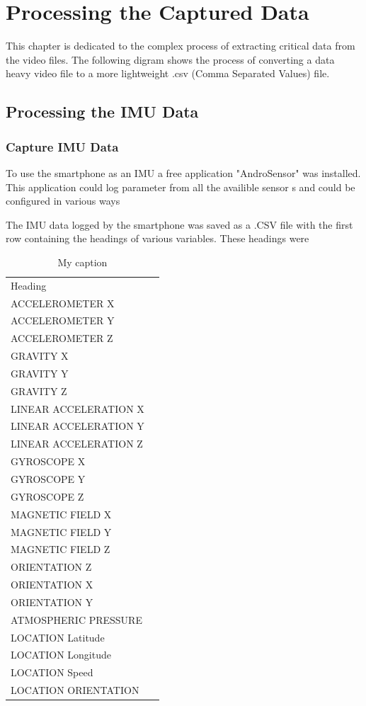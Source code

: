 \chapter{Processing the Captured Data}
This chapter is dedicated to the complex process of extracting critical data from the video files. The following digram shows the process of converting a data heavy video file to a more lightweight .csv (Comma Separated Values) file.

\section{Processing the IMU Data}

\subsection{Capture IMU Data}
To use the smartphone as an IMU a free application "AndroSensor" was installed. This application could log parameter from all the availible sensor s and could be configured in various ways

\cite{androsensor}


The IMU data logged by the smartphone was saved as a .CSV file with the first row containing the headings of various variables. These headings were

\begin{table}
\centering
\caption{My caption}
\label{my-label}
\begin{tabular}{ll}
Heading               &  \\
ACCELEROMETER X       &  \\
ACCELEROMETER Y       &  \\
ACCELEROMETER Z       &  \\
GRAVITY X             &  \\
GRAVITY Y             &  \\
GRAVITY Z             &  \\
LINEAR ACCELERATION X &  \\
LINEAR ACCELERATION Y &  \\
LINEAR ACCELERATION Z &  \\
GYROSCOPE X           &  \\
GYROSCOPE Y           &  \\
GYROSCOPE Z           &  \\
MAGNETIC FIELD X      &  \\
MAGNETIC FIELD Y      &  \\
MAGNETIC FIELD Z      &  \\
ORIENTATION Z         &  \\
ORIENTATION X         &  \\
ORIENTATION Y         &  \\
ATMOSPHERIC PRESSURE  &  \\
LOCATION Latitude     &  \\
LOCATION Longitude    &  \\
LOCATION Speed        &  \\
LOCATION ORIENTATION  & 
\end{tabular}
\end{table}

